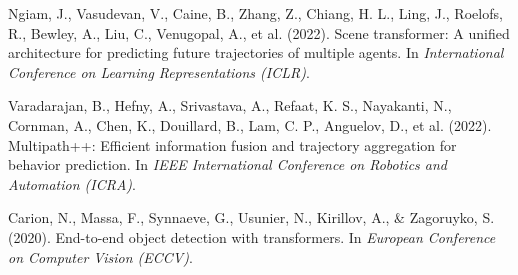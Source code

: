 \begin{thebibliography}{99}
Ngiam, J., Vasudevan, V., Caine, B., Zhang, Z., Chiang, H. L., Ling, J., Roelofs, R., Bewley, A., Liu, C., Venugopal, A., et al. (2022). Scene transformer: A unified architecture for predicting future trajectories of multiple agents. In \textit{International Conference on Learning Representations (ICLR)}.

Varadarajan, B., Hefny, A., Srivastava, A., Refaat, K. S., Nayakanti, N., Cornman, A., Chen, K., Douillard, B., Lam, C. P., Anguelov, D., et al. (2022). Multipath++: Efficient information fusion and trajectory aggregation for behavior prediction. In \textit{IEEE International Conference on Robotics and Automation (ICRA)}.

Carion, N., Massa, F., Synnaeve, G., Usunier, N., Kirillov, A., \& Zagoruyko, S. (2020). End-to-end object detection with transformers. In \textit{European Conference on Computer Vision (ECCV)}.

\end{thebibliography}
